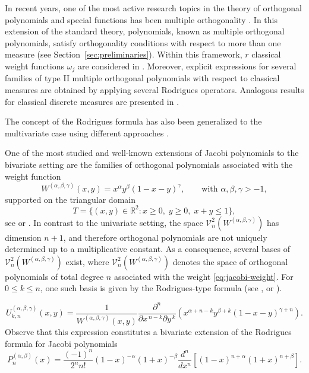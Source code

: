 \documentclass[11pt,reqno]{amsart}
\newcommand{\RR}{\mathbb{R}}
\theoremstyle{definition}
\begin{document}
In recent years, one of the most active research topics in the theory of  orthogonal polynomials and special functions has been multiple orthogonality \citep{Ism05, VA20}. In this extension of the standard theory, polynomials, known as multiple orthogonal polynomials, satisfy orthogonality conditions with respect to more than one measure (see Section~\ref{sec:preliminaries}). Within this framework, $r$ classical weight functions $\omega_j$ are considered in \citep{ABVA03, BCVA05}. Moreover, explicit expressions for several families of type II multiple orthogonal polynomials with respect to classical measures are obtained by applying several Rodrigues operators. Analogous results for classical discrete measures are presented in \citep{ACVA01}.

The concept of the Rodrigues formula has also been generalized to the multivariate case using different approaches \citep{AFPP09,AK26, DX14, Herm1865, Koo75,Sue99}. 


One of the most studied and well-known extensions of Jacobi polynomials to the bivariate setting are the families of orthogonal polynomials associated with the weight function
\begin{equation}
    \label{eq:jacobi-weight}
    W^{(\alpha,\beta,\gamma)}(x,y)=x^\alpha y^\beta (1-x-y)^\gamma,\qquad \text{with }\alpha,\beta,\gamma>-1,
\end{equation}
supported on the triangular domain
\begin{equation}
\label{eq:triangle}
    T = \{(x,y)\in\RR^2: x\geq 0,\; y\geq 0,\; x+y \leq 1\},
\end{equation}
see \citep[Section XXXIII]{AK26} or \citep[Section 2.4]{DX14}. In contrast to the univariate setting, the space
$\mathcal V_n^2(W^{(\alpha,\beta,\gamma)})$
has dimension $n+1$, and therefore orthogonal polynomials are not uniquely determined up to a multiplicative constant. As a consequence, several bases of $\mathcal V_n^2(W^{(\alpha,\beta,\gamma)})$ exist, where $\mathcal V_n^2(W^{(\alpha,\beta,\gamma)})$ denotes the space of orthogonal polynomials of total degree $n$ associated with the weight \eqref{eq:jacobi-weight}. For $0\leq k \leq n$, one such basis is given by the Rodrigues-type formula (see \citep[Proposition 2.4.3]{DX14}, \citep[Chapter V, Section 4]{Sue99} or \citep[Section XXXIII, Eq. (5)]{AK26}).

\begin{equation}
    \label{eq:Rodrigues-2-var}
    U^{(\alpha,\beta,\gamma)}_{k,n}(x,y) = \dfrac{1}{W^{(\alpha,\beta,\gamma)}(x,y)}\dfrac{\partial^n}{\partial x^{\,n-k}\partial y^{\,k}}\left(x^{\alpha+n-k}y^{\beta+k}(1-x-y)^{\gamma+n}\right).
\end{equation}
Observe that this expression constitutes a bivariate extension of the Rodrigues formula for Jacobi polynomials \citep[Section 4.3]{Szego75}
\begin{equation*}
    P_n^{(\alpha, \beta)}(x) = \frac{(-1)^n}{2^n n!} (1-x)^{-\alpha} (1+x)^{-\beta} \frac{d^n}{dx^n} \left[ (1-x)^{n+\alpha} (1+x)^{n+\beta} \right].
\end{equation*}
\end{document}
